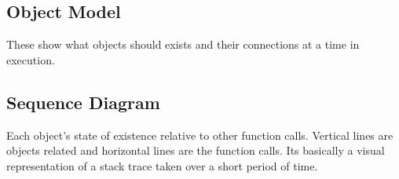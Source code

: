 \documentclass[12pt]{article}
\begin{document}
\subsection*{Object Model}
These show what objects should exists and their connections at a time in execution.

\subsection*{Sequence Diagram}
Each object's state of existence relative to other function calls. Vertical lines are objects related and horizontal lines are the function calls. Its basically a visual representation of a stack trace taken over a short period of time.
\end{document}
